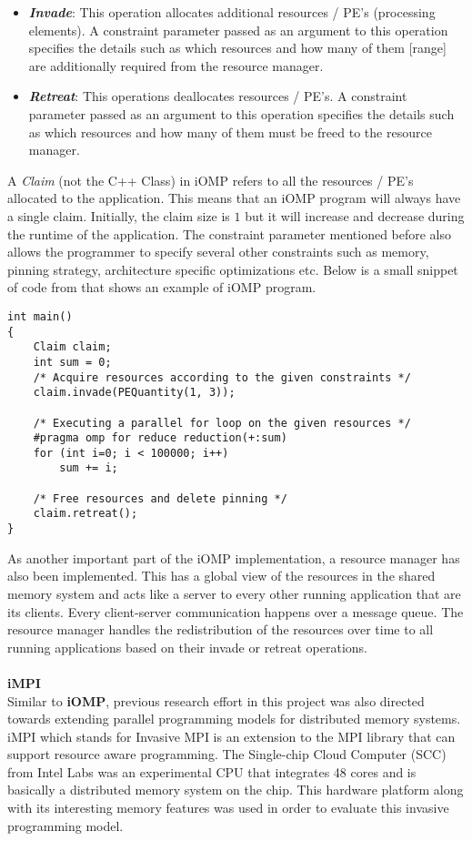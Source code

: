 \begin{itemize}
\item \textbf{\textit{Invade}}: This operation allocates additional resources / PE's (processing elements). A constraint parameter passed as an argument to this operation specifies the details such as which resources and how many of them [range] are additionally required from the resource manager.
\item \textbf{\textit{Retreat}}: This operations deallocates resources / PE's. A constraint parameter passed as an argument to this operation specifies the details such as which resources and how many of them must be freed to the resource manager.
\end{itemize}
A \textit{Claim} (not the C++ Class) in iOMP refers to all the resources / PE's allocated to the application. This means that an iOMP program will always have a single claim. Initially, the claim size is $1$ but it will increase and decrease during the runtime of the application. The constraint parameter mentioned before also allows the programmer to specify several other constraints such as memory, pinning strategy, architecture specific optimizations etc. Below is a small snippet of code from that shows an example of iOMP program.
\begin{lstlisting}[frame=single]
int main() 
{
	Claim claim;
	int sum = 0;
	/* Acquire resources according to the given constraints */
	claim.invade(PEQuantity(1, 3));
	
	/* Executing a parallel for loop on the given resources */
	#pragma omp for reduce reduction(+:sum)
	for (int i=0; i < 100000; i++)
		sum += i;
	
	/* Free resources and delete pinning */
	claim.retreat();
}		
\end{lstlisting}
As another important part of the iOMP implementation, a resource manager has also been implemented. This has a global view of the resources in the shared memory system and acts like a server to every other running application that are its clients. Every client-server communication happens over a message queue. The resource manager handles the redistribution of the resources over time to all running applications based on their invade or retreat operations.\\ \\
\textbf{iMPI}\cite{isaias}\\
Similar to \textbf{iOMP}, previous research effort in this project was also directed towards extending parallel programming models for distributed memory systems. iMPI which stands for Invasive MPI is an extension to the MPI library that can support resource aware programming. The Single-chip Cloud Computer (SCC) from Intel Labs was an experimental CPU that integrates 48 cores and is basically a distributed memory system on the chip. This hardware platform along with its interesting memory features was used in order to evaluate this invasive programming model.\\ \\
